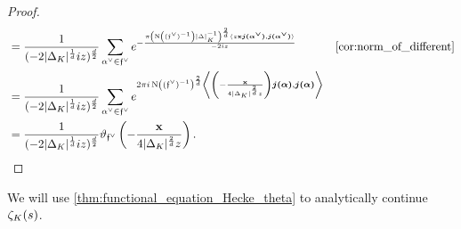 \begin{proof}
\begin{align*}
          &= \frac{1}{(-2|\D_{K}|^{\frac{1}{d}}iz)^{\frac{d}{2}}}\sum_{\a^{\vee} \in \mf{f}^{\vee}}e^{-\frac{\pi\left(\Norm\left((\mf{f}^{\vee})^{-1}\right)|\D|_{K}^{-1}\right)^{\frac{2}{d}}\<z\mathbf{x}\boldsymbol{j(\a^{\vee})},\boldsymbol{j(\a^{\vee})}\>}{-2iz}} && \text{\cref{cor:norm_of_different}} \\
          &= \frac{1}{(-2|\D_{K}|^{\frac{1}{d}}iz)^{\frac{d}{2}}}\sum_{\a^{\vee} \in \mf{f}^{\vee}}e^{2\pi i\Norm\left((\mf{f}^{\vee})^{-1}\right)^{\frac{2}{d}}\left\<\left(-\frac{\mathbf{x}}{4|\D_{K}|^{\frac{2}{d}}z}\right)\boldsymbol{j(\a)},\boldsymbol{j(\a)}\right\>} \\
          &= \frac{1}{(-2|\D_{K}|^{\frac{1}{d}}iz)^{\frac{d}{2}}}\vt_{\mf{f}^{\vee}}\left(-\frac{\mathbf{x}}{4|\D_{K}|^{\frac{2}{d}}z}\right).
        \end{align*}
      \end{proof}

      We will use \cref{thm:functional_equation_Hecke_theta} to analytically continue $\zeta_{K}(s)$.
